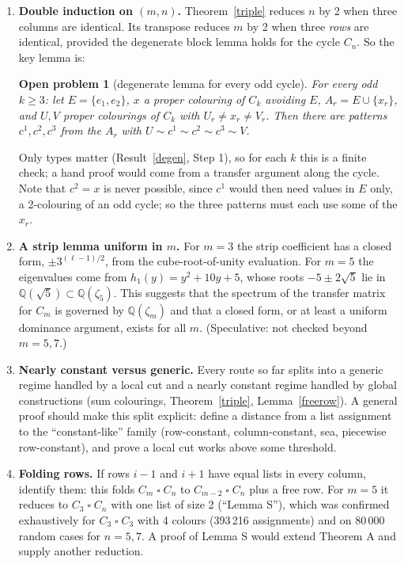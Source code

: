 \documentclass[11pt]{article}
\theoremstyle{plain}
\newtheorem{openprob}[theorem]{Open problem}
\theoremstyle{definition}
\theoremstyle{remark}
\newcommand{\T}{\mathbin{\square}}
\newcommand{\Q}{\mathbb{Q}}
\begin{document}
\begin{enumerate}[itemsep=0.35em]
\item \textbf{Double induction on $(m, n)$.} Theorem~\ref{triple} reduces $n$ by 2 when three columns are identical. Its transpose
reduces $m$ by 2 when three \emph{rows} are identical, provided the degenerate block lemma holds for the cycle $C_n$. So the key
lemma is:

\begin{openprob}[degenerate lemma for every odd cycle]\label{degenk}
For every odd $k \ge 3$: let $E = \{e_1, e_2\}$, $x$ a proper colouring of $C_k$ avoiding $E$, $A_r = E \cup \{x_r\}$, and $U, V$
proper colourings of $C_k$ with $U_r \ne x_r \ne V_r$. Then there are patterns $c^1, c^2, c^3$ from the $A_r$ with
$U \sim c^1 \sim c^2 \sim c^3 \sim V$.
\end{openprob}

Only types matter (Result~\ref{degen}, Step 1), so for each $k$ this is a finite check; a hand proof would come from a transfer
argument along the cycle. Note that $c^2 = x$ is never possible, since $c^1$ would then need values in $E$ only, a 2-colouring of
an odd cycle; so the three patterns must each use some of the $x_r$.

\item \textbf{A strip lemma uniform in $m$.} For $m = 3$ the strip coefficient has a closed form, $\pm 3^{(\ell-1)/2}$, from the
cube-root-of-unity evaluation. For $m = 5$ the eigenvalues come from $h_1(y) = y^2 + 10y + 5$, whose roots $-5 \pm 2\sqrt5$ lie in
$\Q(\sqrt5) \subset \Q(\zeta_5)$. This suggests that the spectrum of the transfer matrix for $C_m$ is governed by $\Q(\zeta_m)$ and
that a closed form, or at least a uniform dominance argument, exists for all $m$. (Speculative: not checked beyond $m = 5, 7$.)

\item \textbf{Nearly constant versus generic.} Every route so far splits into a generic regime handled by a local cut and a
nearly constant regime handled by global constructions (sum colourings, Theorem~\ref{triple}, Lemma~\ref{freerow}). A general
proof should make this split explicit: define a distance from a list assignment to the ``constant-like'' family (row-constant,
column-constant, sea, piecewise row-constant), and prove a local cut works above some threshold.

\item \textbf{Folding rows.} If rows $i - 1$ and $i + 1$ have equal lists in every column, identify them: this folds $C_m \T C_n$ to
$C_{m-2} \T C_n$ plus a free row. For $m = 5$ it reduces to $C_3 \T C_n$ with one list of size 2 (``Lemma S''), which was
confirmed exhaustively for $C_3 \T C_3$ with 4 colours (393\,216 assignments) and on 80\,000 random cases for $n = 5, 7$. A
proof of Lemma S would extend Theorem A and supply another reduction.


\end{enumerate}
\end{document}

